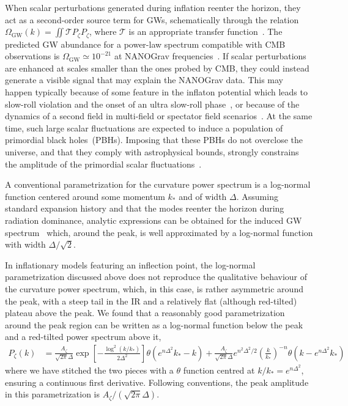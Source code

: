 \documentclass{article}
\begin{document}
When scalar perturbations generated during inflation reenter the horizon, they act as a second-order source term for GWs, schematically through the relation $\Omega_\mathrm{GW}(k) = \iint \mathcal{T} P_\zeta P_\zeta $, where $\mathcal{T}$ is an appropriate transfer function~\cite{Acquaviva:2002ud, Mollerach:2003nq, Ananda:2006af, Baumann:2007zm}. The predicted GW abundance for a power-law spectrum compatible with CMB observations is $\Omega_\mathrm{GW}\simeq 10^{-21}$ at NANOGrav frequencies~\cite{Ananda:2006af}. If scalar perturbations are enhanced at scales smaller than the ones probed by CMB, they could instead generate a visible signal that may explain the NANOGrav data. This may happen typically because of some feature in the inflaton potential which leads to slow-roll violation and the onset of an ultra slow-roll phase~\cite{Garcia-Bellido:2017mdw, Ballesteros:2017fsr}, or because of the dynamics of a second field in multi-field or spectator field scenarios~\cite{Cheong:2022gfc, Espinosa:2018eve}. At the same time, such large scalar fluctuations are expected to induce a population of primordial black holes~(PBHs). Imposing that these PBHs do not overclose the universe, and that they comply with astrophysical bounds, strongly constrains the amplitude of the primordial scalar fluctuations~\cite{Dandoy:2023jot}.

A conventional parametrization for the curvature power spectrum is a log-normal function centered around some momentum $k_*$ and of width $\Delta$.
Assuming standard expansion history and that the modes reenter the horizon during radiation dominance, analytic expressions can be obtained for the induced GW spectrum~\cite{Pi:2020otn, Dandoy:2023jot} which, around the peak, is well approximated by a log-normal function with width $\Delta/\sqrt{2}$.

In inflationary models featuring an inflection point, the log-normal parametrization discussed above does not reproduce the qualitative behaviour of the curvature power spectrum, which, in this case, is rather asymmetric around the peak, with a steep tail in the IR and a relatively flat (although red-tilted) plateau above the peak. We found that a reasonably good parametrization around the peak region can be written as a log-normal function below the peak and a red-tilted power spectrum above it,
\begin{align}\label{eq:broken ps scalar}
    P_\zeta (k) & = \frac{A_\zeta}{\sqrt{2\pi} \Delta} \exp \left[ - \frac{\log^2(k/k_*)}{2\Delta^2}\right] \theta(e^{n\Delta^2} k_*-k) + \frac{A_\zeta}{\sqrt{2\pi} \Delta} e^{n^2\Delta^2/2} \left( \frac{k}{k_*}\right)^{-n} \theta(k- e^{n\Delta^2} k_*)
\end{align}
%
where we have stitched the two pieces with a $\theta$ function centred at $k/k_* = e^{n\Delta^2}$, ensuring a continuous first derivative. Following conventions, the peak amplitude in this parametrization is $A_\zeta/(\sqrt{2\pi}\Delta)$.
\end{document}
